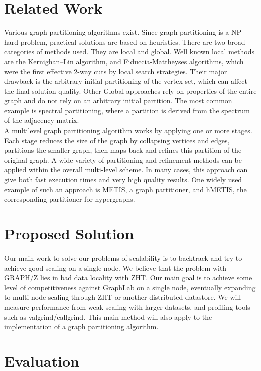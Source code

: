 \documentclass[10pt]{article}
\begin{document}
\begin{multicols}{2}
  \section{Related Work}
  Various graph partitioning algorithms exist. Since graph partitioning is a NP-hard problem, practical solutions are based on heuristics. There are two broad categories of methods used. They are local and global. Well known local methods are the Kernighan–Lin algorithm, and Fiduccia-Mattheyses algorithms, which were the first effective 2-way cuts by local search strategies. Their major drawback is the arbitrary initial partitioning of the vertex set, which can affect the final solution quality. Other Global approaches rely on properties of the entire graph and do not rely on an arbitrary initial partition. The most common example is spectral partitioning, where a partition is derived from the spectrum of the adjacency matrix.\\
  A multilevel graph partitioning algorithm works by applying one or more stages. Each stage reduces the size of the graph by collapsing vertices and edges, partitions the smaller graph, then maps back and refines this partition of the original graph. A wide variety of partitioning and refinement methods can be applied within the overall multi-level scheme. In many cases, this approach can give both fast execution times and very high quality results. One widely used example of such an approach is METIS, a graph partitioner, and hMETIS, the corresponding partitioner for hypergraphs.
  
  \section{Proposed Solution}
  Our main work to solve our problems of scalability is to backtrack and try to achieve good scaling on a single node. We believe that the problem with GRAPH/Z lies in bad data locality with ZHT. Our main goal is to achieve some level of competitiveness against GraphLab on a single node, eventually expanding to multi-node scaling through ZHT or another distributed datastore. We will measure performance from weak scaling with larger datasets, and profiling tools such as valgrind/callgrind. This main method will also apply to the implementation of a graph partitioning algorithm.
  
  \section{Evaluation}
 

\end{multicols}
\end{document}
